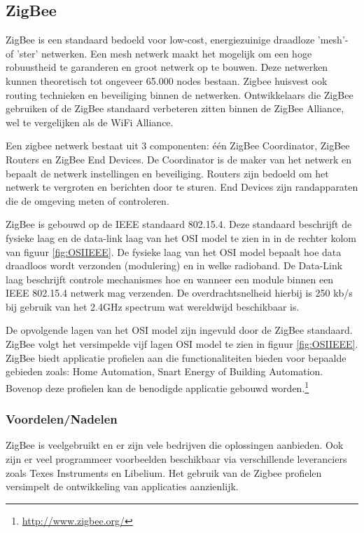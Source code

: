 \documentclass{../local}
\begin{document}
\subsection{ZigBee}

ZigBee is een standaard bedoeld voor low-cost, energiezuinige draadloze 'mesh'- of 'ster' netwerken. Een mesh netwerk maakt het mogelijk om een hoge robuustheid te garanderen en groot netwerk op te bouwen. Deze netwerken kunnen theoretisch tot ongeveer 65.000 nodes bestaan. Zigbee huisvest ook routing technieken en beveiliging binnen de netwerken. Ontwikkelaars die ZigBee gebruiken of de ZigBee standaard verbeteren zitten binnen de ZigBee Alliance, wel te vergelijken als de WiFi Alliance.

Een zigbee netwerk bestaat uit 3 componenten: één ZigBee Coordinator, ZigBee Routers en ZigBee End Devices. De Coordinator is de maker van het netwerk en bepaalt de netwerk instellingen en beveiliging. Routers zijn bedoeld om het netwerk te vergroten en berichten door te sturen. End Devices zijn randapparaten die de omgeving meten of controleren.

ZigBee is gebouwd op de IEEE standaard 802.15.4. Deze standaard beschrijft de fysieke laag en de data-link laag van het OSI model te zien in in de rechter kolom van figuur \ref{fig:OSIIEEE}. De fysieke laag van het OSI model bepaalt hoe data draadloos wordt verzonden (modulering) en in welke radioband. De Data-Link laag beschrijft controle mechanismes hoe en wanneer een module binnen een IEEE 802.15.4 netwerk mag verzenden. De overdrachtsnelheid hierbij is 250 kb/s bij gebruik van het 2.4GHz spectrum wat wereldwijd beschikbaar is.

De opvolgende lagen van het OSI model zijn ingevuld door de ZigBee standaard. ZigBee volgt het versimpelde vijf lagen OSI model te zien in figuur \ref{fig:OSIIEEE}. ZigBee biedt applicatie profielen aan die functionaliteiten bieden voor bepaalde gebieden zoals: Home Automation, Snart Energy of Building Automation. Bovenop deze profielen kan de benodigde applicatie gebouwd worden.\footnote{\url{http://www.zigbee.org/}}

\subsubsection{Voordelen/Nadelen}

ZigBee is veelgebruikt en er zijn vele bedrijven die oplossingen aanbieden. Ook zijn er veel programmeer voorbeelden beschikbaar via verschillende leveranciers zoals Texes Instruments en Libelium. Het gebruik van de Zigbee profielen versimpelt de ontwikkeling van applicaties aanzienlijk.
\end{document}
